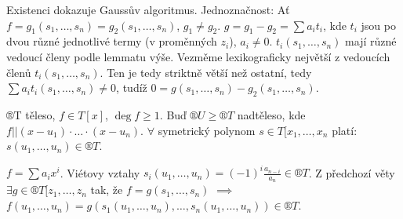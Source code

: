 \documentclass[12pt]{article}                   %
\begin{document}
    \begin{dukazin}
        Existenci dokazuje Gaussův algoritmus. Jednoznačnost: Ať $f = g_1 (s_1, …, s_n) = g_2(s_1, …, s_n)$, $g_1 ≠ g_2$. $g = g_1 - g_2 = \sum a_it_i$, kde $t_i$ jsou po dvou různé jednotlivé termy (v proměnných $z_i$), $a_i≠0$. $t_i(s_1, …, s_n)$ mají různé vedoucí členy podle lemmatu výše. Vezměme lexikograficky největší z vedoucích členů $t_i(s_1, …, s_n)$. Ten je tedy striktně větší než ostatní, tedy $\sum a_it_i(s_1, …, s_n) ≠ 0$, tudíž $0 = g(s_1, …, s_n) - g_2(s_1, …, s_n)$.
    \end{dukazin}

    \begin{dusledek}
        ®T těleso, $f \in T[x]$, $\deg f ≥ 1$. Buď $®U ≥ ®T$ nadtěleso, kde $f || (x - u_1)·…·(x-u_n)$. $\forall$ symetrický polynom $s \in T[x_1, …, x_n$ platí: $s(u_1, …, u_n) \in ®T$.

        \begin{dukazin}
                $f = \sum a_ix^i$. Viétovy vztahy $s_i(u_1, …, u_n) = (-1)^i\frac{a_{n-i}}{a_n} \in ®T$. Z předchozí věty $\exists g \in ®T[z_1, …, z_n$ tak, že $f = g(s_1, …, s_n)$ $\implies$ $f(u_1, …, u_n) = g(s_1(u_1, …, u_n), …, s_n(u_1, …, u_n)) \in ®T$.
        \end{dukazin}
    \end{dusledek}
\end{document}
